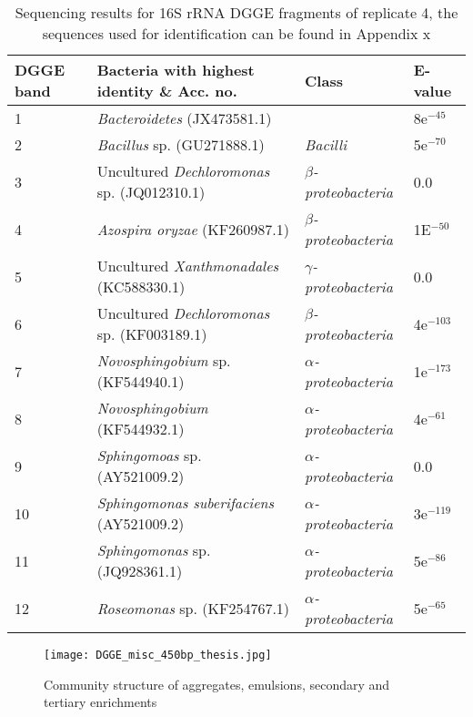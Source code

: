 \documentclass[11pt]{article}
\begin{document}
\begin{sidewaystable}[!htbp]
\begin{tabular}{ | p{1.2cm} | p{10cm} | p{4cm} | p{2cm} | }
\hline
DGGE band & Bacteria with highest identity \& Acc. no. & Class & E-value \\
\hline
1   &  \emph{Bacteroidetes} (JX473581.1) &  & 8e$^{-45}$ \\
\hline
2  & \emph{Bacillus} sp. (GU271888.1) & \emph{Bacilli} & 5e$^{-70}$ \\
\hline
3 & Uncultured \emph{Dechloromonas} sp. (JQ012310.1) & \emph{$\beta$-proteobacteria} & 0.0 \\
\hline
4 & \emph{Azospira oryzae} (KF260987.1) & \emph{$\beta$-proteobacteria} & 1E$^{-50}$ \\
\hline
5 & Uncultured \emph{Xanthmonadales} (KC588330.1) & \emph{$\gamma$-proteobacteria} & 0.0 \\
\hline
6 & Uncultured \emph{Dechloromonas} sp. (KF003189.1) & \emph{$\beta$-proteobacteria} & 4e$^{-103}$ \\
\hline
7 & \emph{Novosphingobium} sp. (KF544940.1) & \emph{$\alpha$-proteobacteria} & 1e$^{-173}$ \\
\hline
8 & \emph{Novosphingobium} (KF544932.1) & \emph{$\alpha$-proteobacteria} & 4e$^{-61}$ \\
\hline
9 & \emph{Sphingomoas} sp. (AY521009.2) & \emph{$\alpha$-proteobacteria} & 0.0 \\
\hline
10 & \emph{Sphingomonas suberifaciens} (AY521009.2) & \emph{$\alpha$-proteobacteria} & 3e$^{-119}$ \\
\hline
11 & \emph{Sphingomonas} sp. (JQ928361.1) & \emph{$\alpha$-proteobacteria} & 5e$^{-86}$ \\
\hline
12 & \emph{Roseomonas} sp.  (KF254767.1) & \emph{$\alpha$-proteobacteria} & 5e$^{-65}$ \\
\hline
\end{tabular}
\caption{Sequencing results for 16S rRNA DGGE fragments of replicate 4, the sequences used for identification can be found in Appendix x}
\end{sidewaystable}

\begin{figure}
\texttt{[image: DGGE\_misc\_450bp\_thesis.jpg]}
\caption{Community structure of aggregates, emulsions, secondary and tertiary enrichments}
\end{figure}
\end{document}
